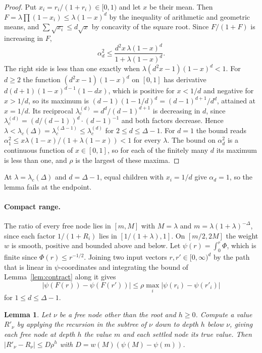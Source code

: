 \documentclass[11pt]{amsart}
\newtheorem{lemma}[theorem]{Lemma}
\newcommand{\lc}{\lambda_c(\Delta)}
\begin{document}
\begin{proof}
Put $x_i=r_i/(1+r_i)\in[0,1)$ and let $x$ be their mean. Then $F=\lambda\prod(1-x_i)\le\lambda(1-x)^d$ by the inequality of arithmetic and geometric means, and $\sum\sqrt{x_i}\le d\sqrt{x}$ by concavity of the square root. Since $F/(1+F)$ is increasing in $F$,
\[
\alpha_d^2\le\frac{d^2x\,\lambda(1-x)^d}{1+\lambda(1-x)^d}.
\]
The right side is less than one exactly when $\lambda(d^2x-1)(1-x)^d<1$. For $d\ge2$ the function $(d^2x-1)(1-x)^d$ on $[0,1]$ has derivative $d(d+1)(1-x)^{d-1}(1-dx)$, which is positive for $x<1/d$ and negative for $x>1/d$, so its maximum is $(d-1)(1-1/d)^d=(d-1)^{d+1}/d^d$, attained at $x=1/d$. Its reciprocal $\lambda_c^{(d)}=d^d/(d-1)^{d+1}$ is decreasing in $d$, since $\lambda_c^{(d)}=(d/(d-1))^d\cdot(d-1)^{-1}$ and both factors decrease. Hence $\lambda<\lc=\lambda_c^{(\Delta-1)}\le\lambda_c^{(d)}$ for $2\le d\le\Delta-1$. For $d=1$ the bound reads $\alpha_1^2\le x\lambda(1-x)/(1+\lambda(1-x))<1$ for every $\lambda$. The bound on $\alpha_d^2$ is a continuous function of $x\in[0,1]$, so for each of the finitely many $d$ its maximum is less than one, and $\rho$ is the largest of these maxima.
\end{proof}

At $\lambda=\lc$ and $d=\Delta-1$, equal children with $x_i=1/d$ give $\alpha_d=1$, so the lemma fails at the endpoint.

\paragraph{Compact range.} The ratio of every free node lies in $[m,M]$ with $M=\lambda$ and $m=\lambda(1+\lambda)^{-\Delta}$, since each factor $1/(1+R_i)$ lies in $[1/(1+\lambda),1]$. On $[m/2,2M]$ the weight $w$ is smooth, positive and bounded above and below. Let $\psi(r)=\int_0^r\Phi$, which is finite since $\Phi(r)\le r^{-1/2}$. Joining two input vectors $r,r'\in[0,\infty)^d$ by the path that is linear in $\psi$-coordinates and integrating the bound of Lemma~\ref{lem:contract} along it gives
\[
|\psi(F(r))-\psi(F(r'))|\le\rho\max_i|\psi(r_i)-\psi(r'_i)|
\]
for $1\le d\le\Delta-1$.

\begin{lemma}\label{lem:trunc}
Let $\nu$ be a free node other than the root and $h\ge0$. Compute a value $R'_\nu$ by applying the recursion in the subtree of $\nu$ down to depth $h$ below $\nu$, giving each free node at depth $h$ the value $m$ and each settled node its true value. Then $|R'_\nu-R_\nu|\le D\rho^h$ with $D=w(M)(\psi(M)-\psi(m))$.
\end{lemma}
\end{document}
